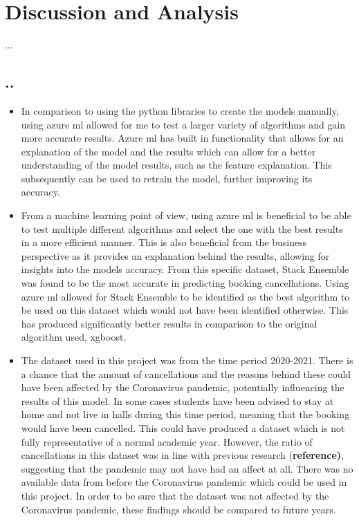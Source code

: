 \chapter{Discussion and Analysis}
...

\section{..}
\begin{itemize}
\item In comparison to using the python libraries to create the models manually, using azure ml allowed for me to test a larger variety of algorithms and gain more accurate results. Azure ml has built in functionality that allows for an explanation of the model and the results which can allow for a better understanding of the model results, such as the feature explanation. This subsequently can be used to retrain the model, further improving its accuracy. 
\item  From a machine learning point of view, using azure ml is beneficial to be able to test multiple different algorithms and select the one with the best results in a more efficient manner. This is also beneficial from the business perspective as it provides an explanation behind the results, allowing for insights into the models accuracy. From this specific dataset, Stack Ensemble was found to be the most accurate in predicting booking cancellations. Using azure ml allowed for Stack Ensemble to be identified as the best algorithm to be used on this dataset which would not have been identified otherwise. This has produced significantly better results in comparison to the original algorithm used, xgboost. 
\item The dataset used in this project was from the time period 2020-2021. There is a chance that the amount of cancellations and the reasons behind these could have been affected by the Coronavirus pandemic, potentially influencing the results of this model. In some cases students have been advised to stay at home and not live in halls during this time period, meaning that the booking would have been cancelled. This could have produced a dataset which is not fully representative of a normal academic year. However, the ratio of cancellations in this dataset was in line with previous research (\textbf{reference)}, suggesting that the pandemic may not have had an affect at all. There was no available data from before the Coronavirus pandemic which could be used in this project. In order to be sure that the dataset was not affected by the Coronavirus pandemic, these findings should be compared to future years.

\end{itemize}
